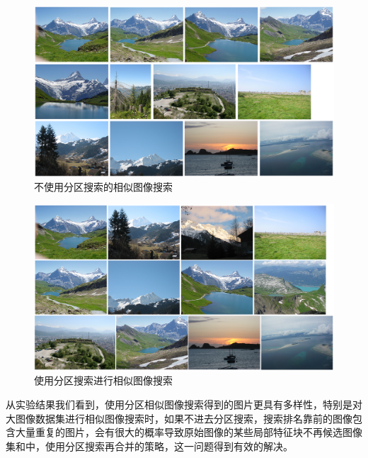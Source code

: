 \begin{figure}
\centering\includegraphics[width=15cm]{imgs/ch4/candidates1}
\caption{不使用分区搜索的相似图像搜索}
\label{fig:candidates1}
\end{figure}

\begin{figure}
\centering\includegraphics[width=15cm]{imgs/ch4/candidates2}
\caption{使用分区搜索进行相似图像搜索}
\label{fig:candidates2}
\end{figure}
从实验结果我们看到，使用分区相似图像搜索得到的图片更具有多样性，特别是对大图像数据集进行相似图像搜索时，如果不进去分区搜索，搜索排名靠前的图像包含大量重复的图片，会有很大的概率导致原始图像的某些局部特征块不再候选图像集和中，使用分区搜索再合并的策略，这一问题得到有效的解决。

\ifx\usechapbib\empty
\nocite{BSTcontrol}


\fi
